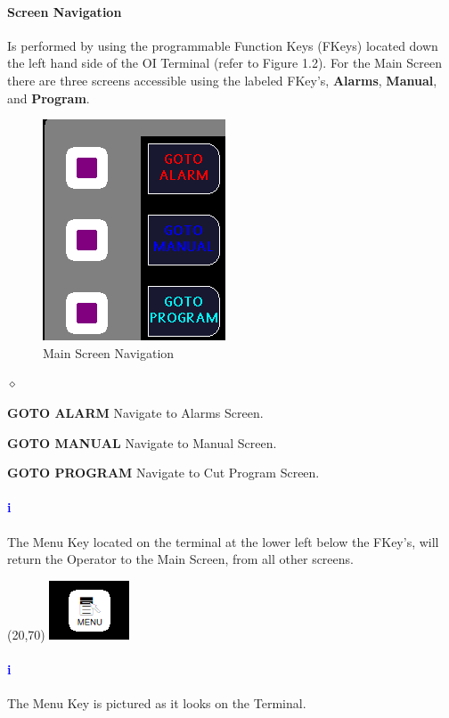 \paragraph*{Screen Navigation}Is performed by using the programmable Function Keys (FKeys) located down the left hand side of the OI Terminal (refer to Figure 1.2). For the Main Screen there are three screens accessible using the labeled FKey's, \textbf{Alarms}, \textbf{Manual}, and \textbf{Program}.
\begin{figure}
		\centering
		\includegraphics[width=.3\linewidth]{screen-captures/main-nav}
		\caption{Main Screen Navigation}
		\label{fig:main-nav}
\end{figure}
\begin{list}{$\diamond$}{}
	\item \textbf{GOTO ALARM} Navigate to Alarms Screen.
	\item \textbf{GOTO MANUAL} Navigate to Manual Screen.
	\item \textbf{GOTO PROGRAM} Navigate to Cut Program Screen.
\end{list}

\paragraph*{\textbf{\LARGE \textcolor{blue}{i}}}
The Menu Key located on the terminal at the lower left below the FKey's, will return the Operator to the Main Screen, from all other screens.\\
\begin{minipage}{4cm}
	\begin{picture}(20,70)
	\includegraphics[width=.5\linewidth]{screen-captures/menu}
	\end{picture}
\end{minipage}\begin{minipage}[]{11cm}
\paragraph{\textbf{\LARGE \textcolor{blue}{i}}} The Menu Key is pictured as it looks on the Terminal.
\end{minipage}
\pagebreak
